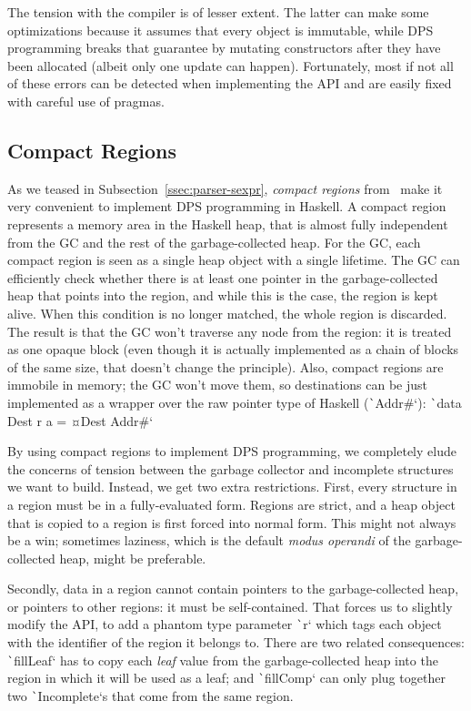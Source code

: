 \documentclass[english]{jflart}
\begin{document}
The tension with the compiler is of lesser extent. The latter can make some optimizations because it assumes that every object is immutable, while DPS programming breaks that guarantee by mutating constructors after they have been allocated (albeit only one update can happen). Fortunately, most if not all of these errors can be detected when implementing the API and are easily fixed with careful use of pragmas.

\subsection{Compact Regions}\label{ssec:impl-compact-regions}

As we teased in Subsection~\ref{ssec:parser-sexpr}, \emph{compact regions} from~\cite{yang_efficient_2015} make it very convenient to implement DPS programming in 
Haskell. A compact region represents a memory area in the Haskell heap, that is almost fully independent from the GC and the rest of the garbage-collected heap. For the GC, each compact region is seen as a single heap object with a single lifetime. The GC can efficiently check whether there is at least one pointer in the garbage-collected heap that points into the region, and while this is the case, the region is kept alive. When this condition is no longer matched, the whole region is discarded. The result is that the GC won't traverse any node from the region: it is treated as one opaque block (even though it is actually implemented as a chain of blocks of the same size, that doesn't change the principle). Also, compact regions are immobile in memory; the GC won't move them, so destinations can be just implemented as a wrapper over the raw pointer type of Haskell (\texttt`Addr#`): \texttt`data Dest r a = ¤Dest Addr#`

By using compact regions to implement DPS programming, we completely elude the concerns of tension between the garbage collector and incomplete structures we want to build. Instead, we get two extra restrictions. First, every structure in a region must be in a fully-evaluated form. Regions are strict, and a heap object that is copied to a region is first forced into normal form. This might not always be a win; sometimes laziness, which is the default \emph{modus operandi} of the garbage-collected heap, might be preferable.

Secondly, data in a region cannot contain pointers to the garbage-collected heap, or pointers to other regions: it must be self-contained. That forces us to slightly modify the API, to add a phantom type parameter \texttt`r` which tags each object with the identifier of the region it belongs to. There are two related consequences: \texttt`fillLeaf` has to copy each \emph{leaf} value from the garbage-collected heap into the region in which it will be used as a leaf; and \texttt`fillComp` can only plug together two \texttt`Incomplete`s that come from the same region.
\end{document}
